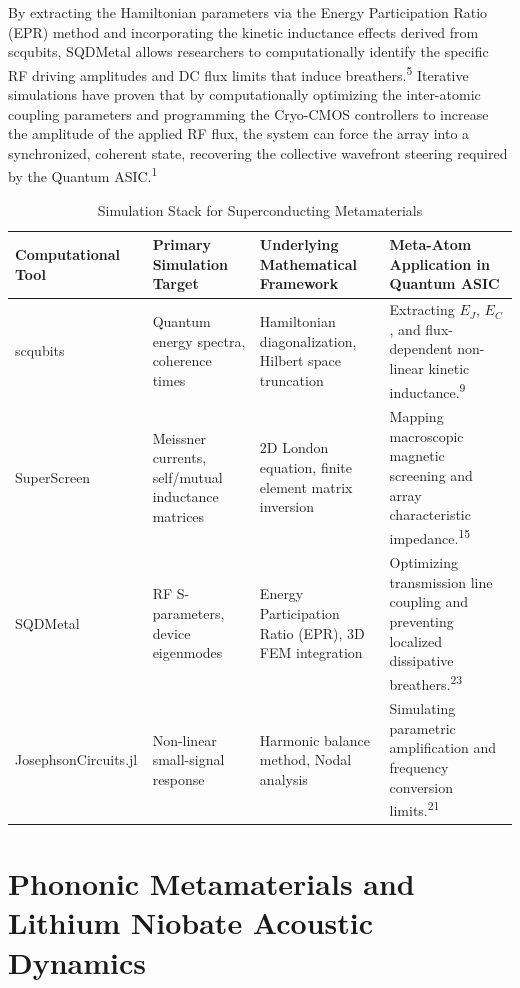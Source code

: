 \documentclass[11pt, a4paper]{article}
\begin{document}
By extracting the Hamiltonian parameters via the Energy Participation Ratio (EPR) method and incorporating the kinetic inductance effects derived from scqubits, SQDMetal allows researchers to computationally identify the specific RF driving amplitudes and DC flux limits that induce breathers.\textsuperscript{5} Iterative simulations have proven that by computationally optimizing the inter-atomic coupling parameters and programming the Cryo-CMOS controllers to increase the amplitude of the applied RF flux, the system can force the array into a synchronized, coherent state, recovering the collective wavefront steering required by the Quantum ASIC.\textsuperscript{1}

\begin{table}[htbp]
\centering
\renewcommand{\arraystretch}{1.5}
\begin{tabularx}{\textwidth}{>{\raggedright\arraybackslash}p{3cm} >{\raggedright\arraybackslash}X >{\raggedright\arraybackslash}X >{\raggedright\arraybackslash}X}
\toprule
\textbf{Computational Tool} & \textbf{Primary Simulation Target} & \textbf{Underlying Mathematical Framework} & \textbf{Meta-Atom Application in Quantum ASIC} \\
\midrule
scqubits & Quantum energy spectra, coherence times & Hamiltonian diagonalization, Hilbert space truncation & Extracting $E_J$, $E_C$, and flux-dependent non-linear kinetic inductance.\textsuperscript{9} \\
SuperScreen & Meissner currents, self/mutual inductance matrices & 2D London equation, finite element matrix inversion & Mapping macroscopic magnetic screening and array characteristic impedance.\textsuperscript{15} \\
SQDMetal & RF S-parameters, device eigenmodes & Energy Participation Ratio (EPR), 3D FEM integration & Optimizing transmission line coupling and preventing localized dissipative breathers.\textsuperscript{23} \\
JosephsonCircuits.jl & Non-linear small-signal response & Harmonic balance method, Nodal analysis & Simulating parametric amplification and frequency conversion limits.\textsuperscript{21} \\
\bottomrule
\end{tabularx}
\caption{Simulation Stack for Superconducting Metamaterials}
\end{table}

\section{Phononic Metamaterials and Lithium Niobate Acoustic Dynamics}
\end{document}
